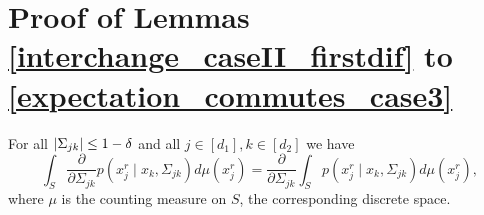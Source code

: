 

\section{Proof of Lemmas \ref{interchange_caseII_firstdif} to \ref{expectation_commutes_case3}}

\begin{lemma}\label{interchange_caseII_firstdif}
    For all $\lvert\Sigma_{jk}\rvert \leq 1-\delta$ and all $j \in [d_1], k\in [d_2]$ we have
    \begin{equation*}
        \int_S \frac{\partial }{\partial \Sigma_{jk}} p(x_j^{r} \mid x_{k}, \Sigma_{jk}) d\mu(x^r_j)= \frac{\partial }{\partial \Sigma_{jk}} \int_S p(x_j^{r} \mid x_{k}, \Sigma_{jk}) d\mu(x^r_j),
    \end{equation*}
    where $\mu$ is the counting measure on $S$, the corresponding discrete space.


\end{lemma}
